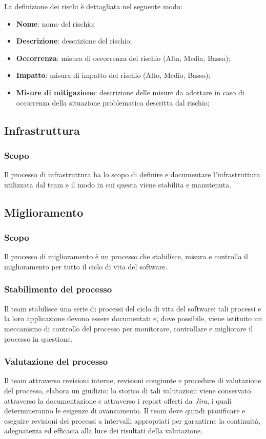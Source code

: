 \documentclass[10pt, a4paper]{article}
\begin{document}
La definizione dei rischi è dettagliata nel seguente modo:
\begin{itemize}
    \item \textbf{Nome}: nome del rischio;
    \item \textbf{Descrizione}: descrizione del rischio;
    \item \textbf{Occorrenza}: misura di occorrenza del rischio (Alta, Media, Bassa);
    \item \textbf{Impatto}: misura di impatto del rischio (Alto, Medio, Basso);
    \item \textbf{Misure di mitigazione}: descrizione delle misure da adottare in caso di occorrenza della situazione problematica descritta dal rischio;
\end{itemize}

\subsection{Infrastruttura}
\subsubsection{Scopo}
Il processo di infrastruttura ha lo scopo di definire e documentare l'infrastruttura utilizzata dal team e il modo in cui questa viene stabilita e manutenuta.

\subsection{Miglioramento}
\subsubsection{Scopo}
Il processo di miglioramento è un processo che stabilisce, misura e controlla il miglioramento per tutto il ciclo di vita del software. 

\subsubsection{Stabilimento del processo}
Il team stabilisce una serie di processi del ciclo di vita del software: tali processi e la loro applicazione devono essere documentati e, 
dove possibile, viene istituito un meccanismo di controllo del processo per monitorare, controllare e migliorare il processo in questione.

\subsubsection{Valutazione del processo}
Il team attraverso revisioni interne, revisioni congiunte e procedure di valutazione del processo, elabora un giudizio: lo storico di tali valutazioni
viene conservato attraverso la documentazione e attraverso i report offerti da \textit{Jira}, i quali determineranno le esigenze di avanzamento.
Il team deve quindi pianificare e eseguire revisioni dei processi a intervalli appropriati per garantirne la continuità, adeguatezza ed efficacia alla 
luce dei risultati della valutazione.
\end{document}
